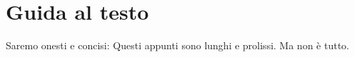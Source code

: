 \chapter*{Guida al testo}
Saremo onesti e concisi: Questi appunti sono lunghi e prolissi. Ma non è
tutto.
